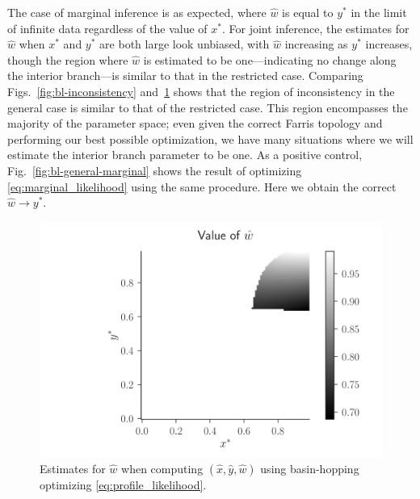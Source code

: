\documentclass{article}
\begin{document}
The case of marginal inference is as expected, where $\hat{w}$ is equal to $y^*$ in the limit of infinite data regardless of the value of $x^*$.
For joint inference, the estimates for $\hat{w}$ when $x^*$ and $y^*$ are both large look unbiased, with $\hat{w}$ increasing as $y^*$ increases, though the region where $\hat{w}$ is estimated to be one---indicating no change along the interior branch---is similar to that in the restricted case.
Comparing Figs.~\ref{fig:bl-inconsistency} and~\ref{fig:bl-general-inconsistency} shows that the region of inconsistency in the general case is similar to that of the restricted case.
This region encompasses the majority of the parameter space; even given the correct Farris topology and performing our best possible optimization, we have many situations where we will estimate the interior branch parameter to be one.
As a positive control, Fig.~\ref{fig:bl-general-marginal} shows the result of optimizing \eqref{eq:marginal_likelihood} using the same procedure.
Here we obtain the correct $\hat{w}\rightarrow y^*$.

\begin{figure}
\centering
\includegraphics[width=\textwidth]{w-hat-empirical-01}
\caption{
    Estimates for $\hat{w}$ when computing $(\hat{x}, \hat{y}, \hat{w})$ using basin-hopping \cite{Wales1997} optimizing \eqref{eq:profile_likelihood}.
}
\label{fig:bl-general-inconsistency}
\end{figure}
\end{document}
